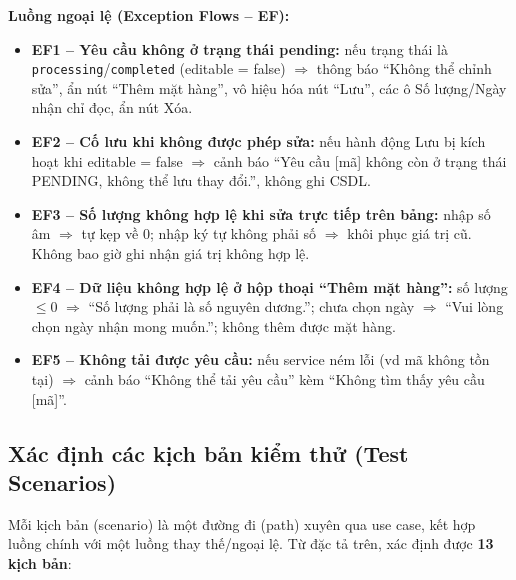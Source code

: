 \documentclass[12pt,a4paper]{article}
\begin{document}
\noindent\textbf{Luồng ngoại lệ (Exception Flows -- EF):}
\begin{itemize}[leftmargin=*]
  \item \textbf{EF1 -- Yêu cầu không ở trạng thái pending:} nếu trạng thái là \texttt{processing}/\texttt{completed} (editable = false) $\Rightarrow$ thông báo ``Không thể chỉnh sửa'', ẩn nút ``Thêm mặt hàng'', vô hiệu hóa nút ``Lưu'', các ô Số lượng/Ngày nhận chỉ đọc, ẩn nút Xóa.
  \item \textbf{EF2 -- Cố lưu khi không được phép sửa:} nếu hành động Lưu bị kích hoạt khi editable = false $\Rightarrow$ cảnh báo ``Yêu cầu [mã] không còn ở trạng thái PENDING, không thể lưu thay đổi.'', không ghi CSDL.
  \item \textbf{EF3 -- Số lượng không hợp lệ khi sửa trực tiếp trên bảng:} nhập số âm $\Rightarrow$ tự kẹp về 0; nhập ký tự không phải số $\Rightarrow$ khôi phục giá trị cũ. Không bao giờ ghi nhận giá trị không hợp lệ.
  \item \textbf{EF4 -- Dữ liệu không hợp lệ ở hộp thoại ``Thêm mặt hàng'':} số lượng $\leq 0$ $\Rightarrow$ ``Số lượng phải là số nguyên dương.''; chưa chọn ngày $\Rightarrow$ ``Vui lòng chọn ngày nhận mong muốn.''; không thêm được mặt hàng.
  \item \textbf{EF5 -- Không tải được yêu cầu:} nếu service ném lỗi (vd mã không tồn tại) $\Rightarrow$ cảnh báo ``Không thể tải yêu cầu'' kèm ``Không tìm thấy yêu cầu [mã]''.
\end{itemize}

\subsection{Xác định các kịch bản kiểm thử (Test Scenarios)}
Mỗi kịch bản (scenario) là một đường đi (path) xuyên qua use case, kết hợp luồng chính với một luồng thay thế/ngoại lệ. Từ đặc tả trên, xác định được \textbf{13 kịch bản}:
\end{document}
